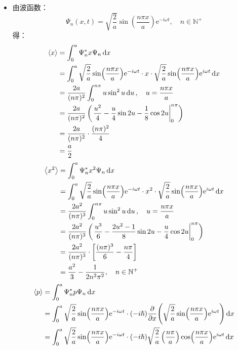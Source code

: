 \documentclass[a4paper,fontset=none]{ctexart}
\renewcommand\hbar\hslash
\begin{document}
\begin{itemize}
        \bigskip
        \item[4.]
        由波函数：
        \[
            \Psi_n(x,t) = \sqrt{\frac{2}{a}}\sin(\frac{n\pi x}{a})\mathrm{e}^{-i\omega t},\quad n \in \mathbb{N}^+
        \]
        得：
        \begin{align*}
            \expval{x}
            &= \int_0^a \Psi_n^* x \Psi_n \dd{x} \\
            &= \int_0^a \sqrt{\frac{2}{a}}\sin(\frac{n\pi x}{a})\mathrm{e}^{-i\omega t} \cdot x \cdot \sqrt{\frac{2}{a}}\sin(\frac{n\pi x}{a})\mathrm{e}^{i\omega t} \dd{x} \\
            &= \frac{2a}{(n\pi)^2} \int_0^{n\pi} u\sin^2{u} \dd{u},\quad u = \frac{n\pi x}{a} \\
            &= \frac{2a}{(n\pi)^2} \left(\eval{\frac{u^2}{4} - \frac{u}{4}\sin{2u} - \frac{1}{8}\cos{2u}}_0^{n\pi}\right) \\
            &= \frac{2a}{(n\pi)^2} \cdot \frac{(n\pi)^2}{4} \\
            &= \frac{a}{2}
        \end{align*}
        \begin{align*}
            \expval{x^2}
            &= \int_0^a \Psi_n^* x^2 \Psi_n \dd{x} \\
            &= \int_0^a \sqrt{\frac{2}{a}}\sin(\frac{n\pi x}{a})\mathrm{e}^{-i\omega t} \cdot x^2 \cdot \sqrt{\frac{2}{a}}\sin(\frac{n\pi x}{a})\mathrm{e}^{i\omega t} \dd{x} \\
            &= \frac{2a^2}{(n\pi)^3} \int_0^{n\pi} u\sin^2{u} \dd{u},\quad u = \frac{n\pi x}{a} \\
            &= \frac{2a^2}{(n\pi)^3} \left(\eval{\frac{u^3}{6} - \frac{2u^2-1}{8}\sin{2u} - \frac{u}{4}\cos{2u}}_0^{n\pi}\right) \\
            &= \frac{2a^2}{(n\pi)^3} \cdot \left[\frac{(n\pi)^3}{6} - \frac{n\pi}{4}\right] \\
            &= \frac{a^2}{3} - \frac{1}{2n^2 \pi^2},\quad n \in \mathbb{N}^+
        \end{align*}
        \begin{align*}
            \expval{p}
            &= \int_0^a \Psi_n^* p \Psi_n \dd{x} \\
            &= \int_0^a \sqrt{\frac{2}{a}}\sin(\frac{n\pi x}{a})\mathrm{e}^{-i\omega t} \cdot (-i\hbar) \pdv{x}(\sqrt{\frac{2}{a}}\sin(\frac{n\pi x}{a})\mathrm{e}^{i\omega t}) \dd{x} \\
            &= \int_0^a \sqrt{\frac{2}{a}}\sin(\frac{n\pi x}{a})\mathrm{e}^{-i\omega t} \cdot (-i\hbar) \sqrt{\frac{2}{a}} \left(\frac{n\pi}{a}\right) \cos(\frac{n\pi x}{a})\mathrm{e}^{i\omega t} \dd{x} \\

\end{align*}
\end{itemize}
\end{document}
